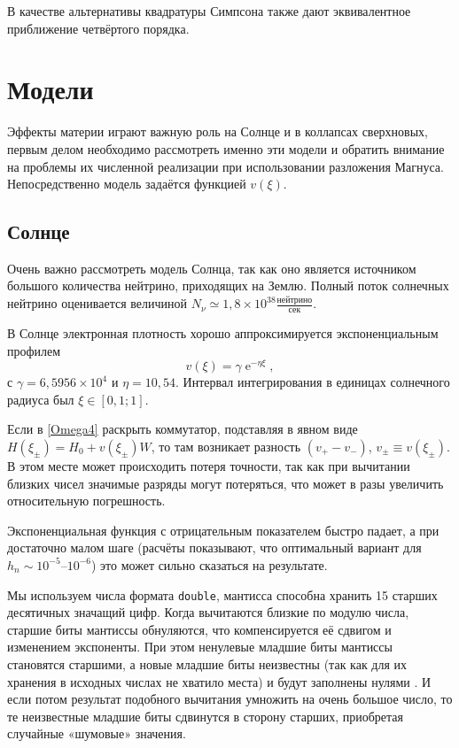 \documentclass[12pt]{article}
\DeclareMathOperator{\Exp}{e}
\renewcommand\exp\Exp
\begin{document}
В качестве альтернативы квадратуры Симпсона также дают эквивалентное приближение
четвёртого порядка.

\section{Модели}

Эффекты материи играют важную роль на Солнце и в коллапсах сверхновых, первым
делом необходимо рассмотреть именно эти модели и обратить внимание на проблемы
их численной реализации при использовании разложения Магнуса. Непосредственно
модель задаётся функцией $v(\xi)$.

\subsection{Солнце}

Очень важно рассмотреть модель Солнца, так как оно является источником большого
количества нейтрино, приходящих на Землю. Полный поток солнечных нейтрино
оценивается величиной
$N_\nu\simeq 1{,}8 \times 10^{38} \frac{\text{нейтрино}}{\text{сек}}$.

В Солнце электронная плотность хорошо аппроксимируется экспоненциальным профилем
\begin{equation}
  v(\xi)=\gamma \exp^{-\eta\xi},
\end{equation}
с $\gamma=6{,}5956\times10^4$ и $\eta=10{,}54$. Интервал интегрирования в
единицах солнечного радиуса был $\xi\in[0{,}1;1]$.

Если в \eqref{Omega4} раскрыть коммутатор, подставляя в явном виде
$H(\xi_\pm)=H_0+v(\xi_\pm)W$, то там возникает разность $(v_+-v_-)$,
$v_\pm\equiv v(\xi_\pm)$. В этом месте может происходить потеря точности, так
как при вычитании близких чисел значимые разряды могут потеряться, что может в
разы увеличить относительную погрешность.

Экспоненциальная функция с отрицательным показателем быстро падает, а при
достаточно малом шаге (расчёты показывают, что оптимальный вариант для
\(h_n\sim 10^{-5}\)–\(10^{-6}\)) это может сильно сказаться на результате.

Мы используем числа формата \verb|double|, мантисса способна хранить 15 старших
десятичных значащий цифр. Когда вычитаются близкие по модулю числа, старшие биты
мантиссы обнуляются, что компенсируется её сдвигом и изменением экспоненты. При
этом ненулевые младшие биты мантиссы становятся старшими, а новые младшие биты
неизвестны (так как для их хранения в исходных числах не хватило места) и будут
заполнены нулями%
. И если потом результат подобного вычитания умножить на очень
большое число, то те неизвестные младшие биты сдвинутся в сторону старших,
приобретая случайные «шумовые» значения.
\end{document}
